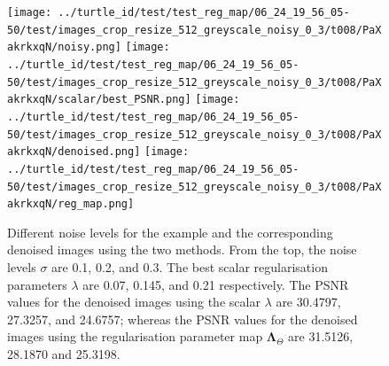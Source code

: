 \documentclass[12pt]{article}
\begin{document}
\begin{figure}[H]
    \texttt{[image: ../turtle\_id/test/test\_reg\_map/06\_24\_19\_56\_05-50/test/images\_crop\_resize\_512\_greyscale\_noisy\_0\_3/t008/PaXakrkxqN/noisy.png]}
    \texttt{[image: ../turtle\_id/test/test\_reg\_map/06\_24\_19\_56\_05-50/test/images\_crop\_resize\_512\_greyscale\_noisy\_0\_3/t008/PaXakrkxqN/scalar/best\_PSNR.png]}
    \texttt{[image: ../turtle\_id/test/test\_reg\_map/06\_24\_19\_56\_05-50/test/images\_crop\_resize\_512\_greyscale\_noisy\_0\_3/t008/PaXakrkxqN/denoised.png]}
    \texttt{[image: ../turtle\_id/test/test\_reg\_map/06\_24\_19\_56\_05-50/test/images\_crop\_resize\_512\_greyscale\_noisy\_0\_3/t008/PaXakrkxqN/reg\_map.png]}

    \caption{
        Different noise levels for the example and the corresponding denoised images using the two methods.
        From the top, the noise levels $\sigma$ are 0.1, 0.2, and 0.3.
        The best scalar regularisation parameters $\lambda$ are 
        0.07, 
        0.145, 
        and 
        0.21 
        respectively.
        The PSNR values for the denoised images using the scalar $\lambda$ are
        30.4797,
        27.3257,
        and
        24.6757;
        whereas the PSNR values for the denoised images using the regularisation parameter map $\mathbf{\Lambda}_\Theta$ are
        31.5126,
        28.1870
        and
        25.3198.
    }

\end{figure}



\end{document}
